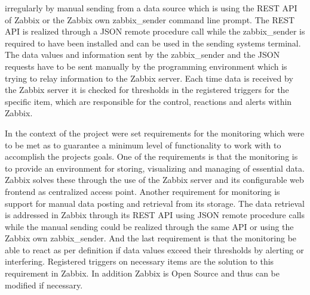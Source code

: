 irregularly by manual sending from a data source which is using the REST API of Zabbix or the Zabbix own zabbix\_sender command line prompt. The REST API is realized through a JSON remote procedure call while the zabbix\_sender is required to have been installed and can be used in the sending systems terminal. The data values and information sent by the zabbix\_sender and the JSON requests have to be sent manually by the programming environment which is trying to relay information to the Zabbix server. Each time data is received by the Zabbix server it is checked for thresholds in the registered triggers for the specific item, which are responsible for the control, reactions and alerts within Zabbix.\cite{zab2, zab3}
	
	In the context of the project were set requirements for the monitoring which were to be met as to guarantee a minimum level of functionality to work with to accomplish the projects goals. One of the requirements is that the monitoring is to provide an environment for storing, visualizing and managing of essential data. Zabbix solves these through the use of the Zabbix server and its configurable web frontend as centralized access point. Another requirement for monitoring is support for manual data posting and retrieval from its storage. The data retrieval is addressed in Zabbix through its REST API using JSON remote procedure calls while the manual sending could be realized through the same API or using the Zabbix own zabbix\_sender. And the last requirement is that the monitoring be able to react as per definition if data values exceed their thresholds by alerting or interfering. Registered triggers on necessary items are the solution to this requirement in Zabbix. In addition Zabbix is Open Source and thus can be modified if necessary.
